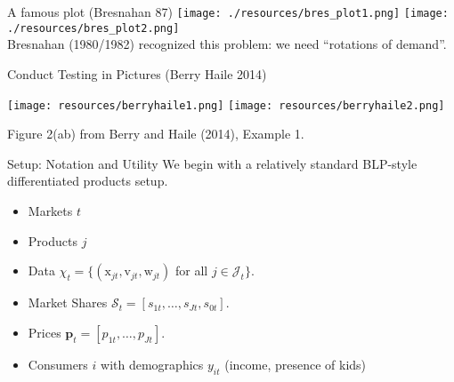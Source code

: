\begin{frame}{A famous plot (Bresnahan 87)}
\texttt{[image: ./resources/bres\_plot1.png]}
\texttt{[image: ./resources/bres\_plot2.png]}\\
Bresnahan (1980/1982) recognized this problem: we need ``rotations of demand''.
\end{frame}


\begin{frame}[plain]{Conduct Testing in Pictures (Berry Haile 2014)}
\begin{center}
\texttt{[image: resources/berryhaile1.png]}
\texttt{[image: resources/berryhaile2.png]}
\end{center}
\small{Figure 2(ab) from Berry and Haile (2014), Example 1.}
\end{frame}




\begin{frame}{Setup: Notation and Utility}
We begin with a relatively standard BLP-style differentiated products setup.\\

\begin{itemize}
    \item Markets $t$
    \item Products $j$
    \item Data $\chi_t = \{(\textrm{x}_{jt},\textrm{v}_{jt},\textrm{w}_{jt})$ for all $j \in \mathcal{J}_t\}$.
    \item Market Shares $\mathcal{S}_t = [s_{1t}, \ldots, s_{Jt}, s_{0t}]$.
    \item Prices $\mathbf{p}_t = [p_{1t}, \ldots, p_{Jt}]$.
    \item Consumers $i$ with demographics $y_{it}$ (income, presence of kids)
\end{itemize}
\end{frame}

